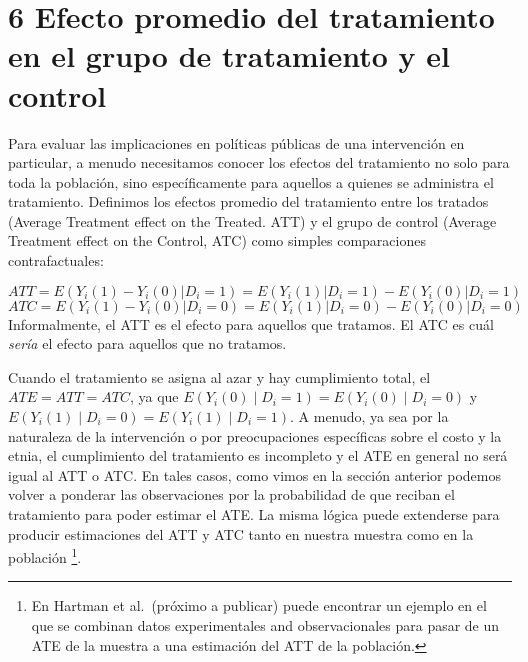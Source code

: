 \documentclass[
]{article}
\begin{document}
\hypertarget{efecto-promedio-del-tratamiento-en-el-grupo-de-tratamiento-y-el-control}{%
\section{6 Efecto promedio del tratamiento en el grupo de tratamiento y
el
control}\label{efecto-promedio-del-tratamiento-en-el-grupo-de-tratamiento-y-el-control}}

Para evaluar las implicaciones en políticas públicas de una intervención
en particular, a menudo necesitamos conocer los efectos del tratamiento
no solo para toda la población, sino específicamente para aquellos a
quienes se administra el tratamiento. Definimos los efectos promedio del
tratamiento entre los tratados (Average Treatment effect on the Treated.
ATT) y el grupo de control (Average Treatment effect on the Control,
ATC) como simples comparaciones contrafactuales:

\[ATT=E(Y_i(1)-Y_i(0)|D_i=1)=E(Y_i(1)|D_i=1)-E(Y_i(0)|D_i=1)\]
\[ATC=E(Y_i(1)-Y_i(0)|D_i=0)=E(Y_i(1)|D_i=0)-E(Y_i(0)|D_i=0)\]
Informalmente, el ATT es el efecto para aquellos que tratamos. El ATC es
cuál \emph{sería} el efecto para aquellos que no tratamos.

Cuando el tratamiento se asigna al azar y hay cumplimiento total, el
\(ATE= ATT =ATC\), ya que \(E(Y_i (0) ∣D_i = 1) = E (Y_i (0) ∣D_i = 0)\)
y \(E ( Y_i (1) ∣D_i = 0) = E (Y_i (1) ∣D_i = 1)\). A menudo, ya sea por
la naturaleza de la intervención o por preocupaciones específicas sobre
el costo y la etnia, el cumplimiento del tratamiento es incompleto y el
ATE en general no será igual al ATT o ATC. En tales casos, como vimos en
la sección anterior podemos volver a ponderar las observaciones por la
probabilidad de que reciban el tratamiento para poder estimar el ATE. La
misma lógica puede extenderse para producir estimaciones del ATT y ATC
tanto en nuestra muestra como en la población \footnote{En Hartman et
  al.~(próximo a publicar) puede encontrar un ejemplo en el que se
  combinan datos experimentales and observacionales para pasar de un ATE
  de la muestra a una estimación del ATT de la población.}.
\end{document}
